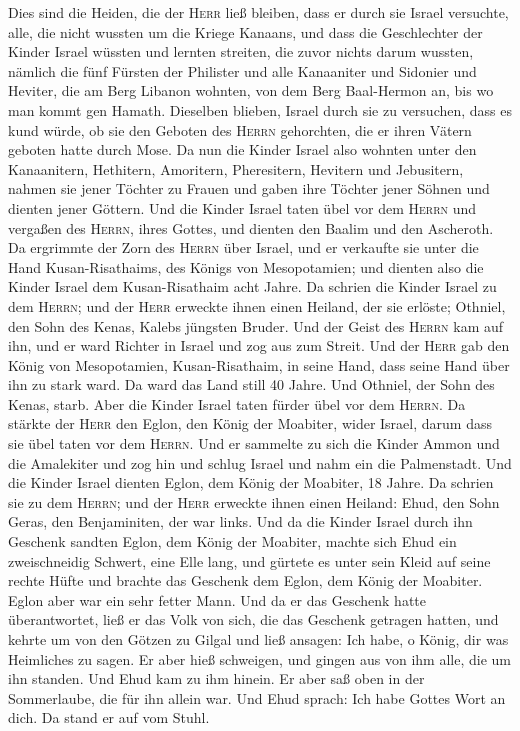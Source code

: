  Dies sind die Heiden, die der \textsc{Herr} ließ bleiben,
dass er durch sie Israel versuchte, alle, die nicht wussten um die
Kriege Kanaans,  und dass die Geschlechter der Kinder
Israel wüssten und lernten streiten, die zuvor nichts darum wussten,
 nämlich die fünf Fürsten der Philister und alle
Kanaaniter und Sidonier und Heviter, die am Berg Libanon wohnten, von
dem Berg Baal-Hermon an, bis wo man kommt gen Hamath. 
Dieselben blieben, Israel durch sie zu versuchen, dass es kund würde, ob
sie den Geboten des \textsc{Herrn} gehorchten, die er ihren Vätern
geboten hatte durch Mose.  Da nun die Kinder Israel also
wohnten unter den Kanaanitern, Hethitern, Amoritern, Pheresitern,
Hevitern und Jebusitern,  nahmen sie jener Töchter zu
Frauen und gaben ihre Töchter jener Söhnen und dienten jener Göttern.
 Und die Kinder Israel taten übel vor dem \textsc{Herrn}
und vergaßen des \textsc{Herrn}, ihres Gottes, und dienten den Baalim
und den Ascheroth.  Da ergrimmte der Zorn des
\textsc{Herrn} über Israel, und er verkaufte sie unter die Hand
Kusan-Risathaims, des Königs von Mesopotamien; und dienten also die
Kinder Israel dem Kusan-Risathaim acht Jahre.  Da schrien
die Kinder Israel zu dem \textsc{Herrn}; und der \textsc{Herr} erweckte
ihnen einen Heiland, der sie erlöste; Othniel, den Sohn des Kenas,
Kalebs jüngsten Bruder.  Und der Geist des \textsc{Herrn}
kam auf ihn, und er ward Richter in Israel und zog aus zum Streit. Und
der \textsc{Herr} gab den König von Mesopotamien, Kusan-Risathaim, in
seine Hand, dass seine Hand über ihn zu stark ward.  Da
ward das Land still 40 Jahre. Und Othniel, der Sohn des Kenas, starb.
 Aber die Kinder Israel taten fürder übel vor dem
\textsc{Herrn}. Da stärkte der \textsc{Herr} den Eglon, den König der
Moabiter, wider Israel, darum dass sie übel taten vor dem
\textsc{Herrn}.  Und er sammelte zu sich die Kinder Ammon
und die Amalekiter und zog hin und schlug Israel und nahm ein die
Palmenstadt.  Und die Kinder Israel dienten Eglon, dem
König der Moabiter, 18 Jahre.  Da schrien sie zu dem
\textsc{Herrn}; und der \textsc{Herr} erweckte ihnen einen Heiland:
Ehud, den Sohn Geras, den Benjaminiten, der war links. Und da die Kinder
Israel durch ihn Geschenk sandten Eglon, dem König der Moabiter,
 machte sich Ehud ein zweischneidig Schwert, eine Elle
lang, und gürtete es unter sein Kleid auf seine rechte Hüfte
 und brachte das Geschenk dem Eglon, dem König der
Moabiter. Eglon aber war ein sehr fetter Mann.  Und da er
das Geschenk hatte überantwortet, ließ er das Volk von sich, die das
Geschenk getragen hatten,  und kehrte um von den Götzen
zu Gilgal und ließ ansagen: Ich habe, o König, dir was Heimliches zu
sagen. Er aber hieß schweigen, und gingen aus von ihm alle, die um ihn
standen.  Und Ehud kam zu ihm hinein. Er aber saß oben in
der Sommerlaube, die für ihn allein war. Und Ehud sprach: Ich habe
Gottes Wort an dich. Da stand er auf vom Stuhl.

